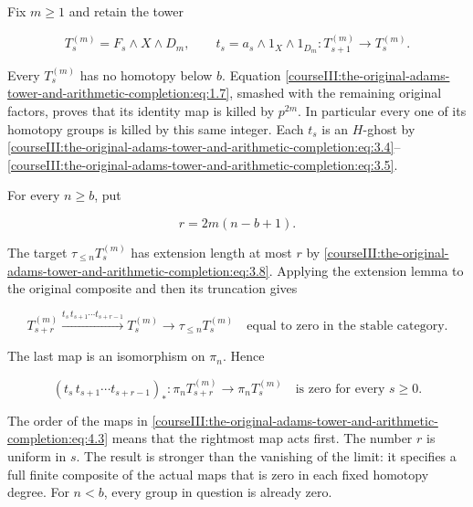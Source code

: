 Fix \(m\geq1\) and retain the tower

\begin{equation}
T_s^{(m)}=F_s\wedge X\wedge D_m,
\qquad
t_s=a_s\wedge1_X\wedge1_{D_m}:T_{s+1}^{(m)}\longrightarrow T_s^{(m)}.
\label{courseIII:the-original-adams-tower-and-arithmetic-completion:eq:4.1}
\end{equation}

Every \(T_s^{(m)}\) has no homotopy below \(b\). Equation \eqref{courseIII:the-original-adams-tower-and-arithmetic-completion:eq:1.7}, smashed with the remaining original factors, proves that its identity map is killed by \(p^{2m}\). In particular every one of its homotopy groups is killed by this same integer. Each \(t_s\) is an \(H\)-ghost by \eqref{courseIII:the-original-adams-tower-and-arithmetic-completion:eq:3.4}--\eqref{courseIII:the-original-adams-tower-and-arithmetic-completion:eq:3.5}.

For every \(n\geq b\), put

\begin{equation}
r=2m(n-b+1).
\label{courseIII:the-original-adams-tower-and-arithmetic-completion:eq:4.2}
\end{equation}

The target \(\tau_{\leq n}T_s^{(m)}\) has extension length at most \(r\) by \eqref{courseIII:the-original-adams-tower-and-arithmetic-completion:eq:3.8}. Applying the extension lemma to the original composite and then its truncation gives

\begin{equation}
T_{s+r}^{(m)}\xrightarrow{t_s\,t_{s+1}\cdots t_{s+r-1}}T_s^{(m)}
\longrightarrow\tau_{\leq n}T_s^{(m)}
\quad\text{equal to zero in the stable category}.
\label{courseIII:the-original-adams-tower-and-arithmetic-completion:eq:4.3}
\end{equation}

The last map is an isomorphism on \(\pi_n\). Hence

\begin{equation}
(t_s\,t_{s+1}\cdots t_{s+r-1})_*:
\pi_nT_{s+r}^{(m)}\longrightarrow\pi_nT_s^{(m)}
\quad\text{is zero for every }s\geq0.
\label{courseIII:the-original-adams-tower-and-arithmetic-completion:eq:4.4}
\end{equation}

The order of the maps in \eqref{courseIII:the-original-adams-tower-and-arithmetic-completion:eq:4.3} means that the rightmost map acts first. The number \(r\) is uniform in \(s\). The result is stronger than the vanishing of the limit: it specifies a full finite composite of the actual maps that is zero in each fixed homotopy degree. For \(n<b\), every group in question is already zero.

